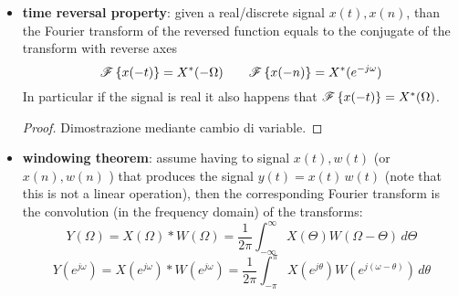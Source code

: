 \begin{itemize}
		As corollary to this property is that if the function $x(t)$ is real and even, it happens that $X(-\Omega) = X(\Omega)$ and the transform it's also inside the real domain (not the complex one).
		\begin{proof}
			Given the even function $x(t) \in \mathds R$ we can write
			\begin{align*}
				X(\Omega) & = \int_{-\infty}^\infty x(t) \overbrace{\big(\cos(\Omega t) + \cancel{j \sin(\Omega t)}\big)}^{e ^{-j\Omega t}} \, dt 
			\end{align*}
			Due to the fact that for an even function only the cosine part of the $e^{j\Omega}$ remains, this means that also the spectrum is real.
		\end{proof}
		Instead if the real function $x(t)$ is odd, than $X(\Omega)$ is purely imaginary.
		\begin{proof}
			Given the even function $x(t) \in \mathds R$ we can write
			\begin{align*}
				X(\Omega) & = \int_{-\infty}^\infty x(t) \overbrace{\big(\cancel{\cos(\Omega t)} + {j \sin(\Omega t)}\big)}^{e ^{-j\Omega t}} \, dt 
			\end{align*}
			Due to the fact that for an odd function only the sine part of the $e^{j\Omega}$ remains, this means that also the spectrum is real.
		\end{proof}
		In general every real function $x(t)$ can be decomposed into two function: an even one $x_e(t)$ and a odd one $x_o$ defined as
		\[ x_e(t) = \frac{x(t)+x(-t)}{2} \qquad x_o = \frac{x(t)-x(-t)}{2} \qquad \Rightarrow \quad x(t) = x_e(t)+ x_o(t) \]
		This means that the spectrum of every function can be subdivided in only real part (associated to $x_e$) and a purely imaginary part (associated to $x_o$):
		\[ X(\Omega) = \int_{-\infty}^\infty x_e(t) \cos(\Omega t) \, dt + j \int_{-\infty}^\infty x_o(t)\, \sin(\Omega t)\, dt = X_e(\Omega) - j X_o(\Omega)\]
	
		\item \textbf{time reversal property}: given a real/discrete signal $x(t),x(n)$, than the Fourier transform of the reversed function equals to the conjugate of the transform with reverse axes
		\[ \mathscr{F}\left\{ x(-t) \right\} = X^*(-\Omega) \qquad \mathscr{F}\left\{ x(-n) \right\} =X^*(e^{-j\omega}) \]
		In particular if the signal is real it also happens that $\mathscr{F}\left\{ x(-t) \right\} = X^*(\Omega)$.
		\begin{proof}
			Dimostrazione mediante cambio di variable.
		\end{proof}
		
		\item \textbf{windowing theorem}: assume having to signal $x(t),w(t)$ (or $x(n), w(n)$ ) that produces the signal $y(t) = x(t) \, w(t)$ (note that this is not a linear operation), then the corresponding Fourier transform is the convolution (in the frequency domain) of the transforms:
		\[ Y(\Omega) = X(\Omega)*W(\Omega) = \frac 1 {2\pi} \int_{-\infty}^{\infty} X(\Theta) W(\Omega - \Theta)\, d\Theta \]
		\[ Y(e^{j\omega}) = X(e^{j\omega}) * W(e^{j\omega}) = \frac 1 {2\pi} \int_{-\pi}^\pi X(e^{j\theta}) W(e^{j(\omega-\theta)}) \, d\theta  \]
		

\end{itemize}
